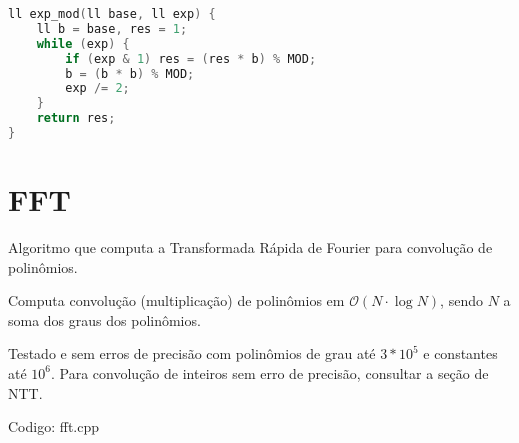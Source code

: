 \documentclass[10pt, a4paper, oneside]{book}
\begin{document}
\begin{lstlisting}[language=C++]
ll exp_mod(ll base, ll exp) {
    ll b = base, res = 1;
    while (exp) {
        if (exp & 1) res = (res * b) % MOD;
        b = (b * b) % MOD;
        exp /= 2;
    }
    return res;
}
\end{lstlisting}
\hfill

\section{FFT}


Algoritmo que computa a Transformada Rápida de Fourier para convolução de polinômios.



Computa convolução (multiplicação) de polinômios em $\mathcal{O}(N \cdot \log N)$, sendo $N$ a soma dos graus dos polinômios.



Testado e sem erros de precisão com polinômios de grau até $3 * 10^5$ e constantes até $10^6$. Para convolução de inteiros sem erro de precisão, consultar a seção de NTT.

\hfill

Codigo: fft.cpp
\end{document}
